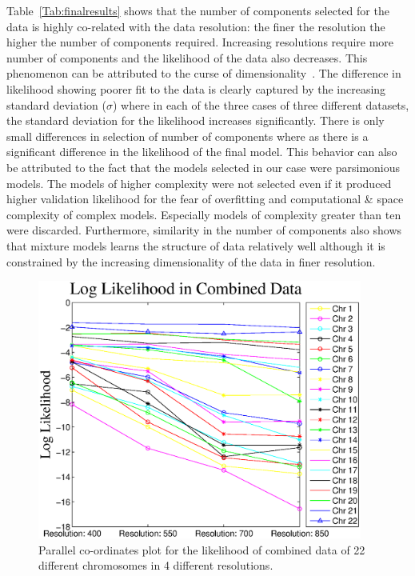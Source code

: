 Table~\ref{Tab:finalresults} shows that the number of components selected for the data is highly co-related with the data resolution: the finer the resolution the higher the number of components required. Increasing resolutions require more number of components and the likelihood of the data also decreases. This phenomenon can be attributed to the curse of dimensionality~\cite{curse}. The difference in likelihood showing poorer fit to the data is clearly captured by the increasing standard deviation ($\sigma$) where in each of the three cases of three different datasets, the standard deviation for the likelihood increases significantly. There is only small differences in selection of number of components where as there is a significant difference in the likelihood of the final model. This behavior can also be attributed to the fact that the models selected in our case were parsimonious models. The models of higher complexity were not selected even if it produced higher validation likelihood for the fear of overfitting and computational \& space complexity of complex models. Especially models of complexity greater than ten were discarded. Furthermore, similarity in the number of components also shows that mixture models learns the structure of data relatively well although it is constrained by the increasing dimensionality of the data in finer resolution.

\begin{figure}[h!]
\centering
\includegraphics[width=0.95\textwidth]{figures/parcorcombined}
\caption[Parallel co-ordinates plot of likelihood of integrated data]{Parallel co-ordinates plot for the likelihood of combined data of 22 different chromosomes in 4 different resolutions.}\label{Fig:parcorcombined}
\end{figure}


